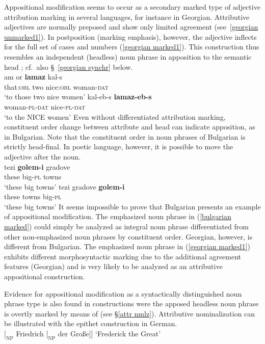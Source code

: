 Appositional modification seems to occur as a secondary marked type of adjective attribution marking in several languages, for instance in Georgian. Attributive adjectives are normally preposed and show only limited agreement (see~\ref{georgian unmarked1}). In postposition (marking emphasis), however, the adjective inflects for the full set of cases and numbers (\ref{georgian marked1}). This construction thus resembles an independent (headless) noun phrase in apposition to the semantic head \citep[652, 677]{testelec1998}; cf.~also \S~\ref{georgian synchr} below.
\ea
{}\\
\ea \label{georgian unmarked1}
\gll	am or \textbf{lamaz} kal-s\\
	that:\textsc{obl} two nice:\textsc{obl} woman-\textsc{dat}\\
\glt	‘to those two nice women’
\ex \label{georgian marked1}
\gll	kal-eb-s \textbf{lamaz-eb-s}\\
	woman-\textsc{pl}-\textsc{dat} nice-\textsc{pl}-\textsc{dat}\\
\glt	‘to the NICE women’
\z
\z
Even without differentiated attribution marking, constituent order change between attribute and head can indicate apposition, as in Bulgarian. Note that the constituent order in noun phrases of Bulgarian is strictly head-final. In poetic language, however, it is possible to move the adjective after the noun.
\ea
{}\\
\ea
\gll	tezi \textbf{golem-i} gradove\\
	these big-\textsc{pl} towns\\
\glt	‘these big towns’
\ex	\label{bulgarian marked}
\gll	tezi gradove \textbf{golem-i}\\
	these towns big-\textsc{pl}\\
\glt	‘these big towns’
\z
\z
It seems impossible to prove that Bulgarian presents an example of appositional modification. The emphasized noun phrase in (\ref{bulgarian marked}) could simply be analyzed as integral noun phrase differentiated from other non-emphasized noun phrases by constituent order. Georgian, however, is different from Bulgarian. The emphasized noun phrase in (\ref{georgian marked1}) exhibits different morphosyntactic marking due to the additional agreement features (Georgian) and is very likely to be analyzed as an attributive appositional construction.

Evidence for appositional modification as a syntactically distinguished noun phrase type is also found in constructions were the apposed headless noun phrase is overtly marked by means of  (see \S \ref{attr nmlz}). Attributive nominalization can be illustrated with the epithet construction in German.
\ea 
{}\\
$[_\textrm{NP}$ Friedrich $[_\textrm{NP}$ der Gro{ß}e$] ]$ \textrm{‘Frederick the Great’}
\z
{}